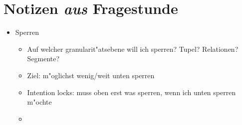 \documentclass[a4paper, 12pt]{scrartcl}
\begin{document}
\section{Notizen \emph{aus} Fragestunde}
\begin{itemize}
	\item
		Sperren
		\begin{itemize}
			\item
				Auf welcher granularit"atsebene will ich sperren? Tupel? Relationen? Segmente?
			\item
				Ziel: m"oglichst wenig/weit unten sperren
			\item
				Intention locks: muss oben erst was sperren, wenn ich unten sperren m"ochte
			\item
		\end{itemize}
\end{itemize}
\end{document}
